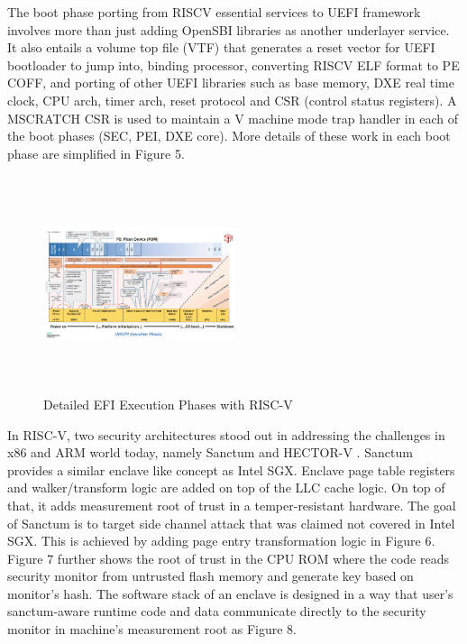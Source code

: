 \documentclass[a4paper,fleqn]{cas-dc}
\begin{document}
The boot phase porting from RISCV essential services to UEFI framework involves more than just adding OpenSBI libraries as another underlayer service. It also entails a volume top file (VTF) that generates a reset vector for UEFI bootloader to jump into, binding processor, converting RISCV ELF format to PE COFF, and porting of other UEFI libraries such as base memory, DXE real time clock, CPU arch, timer arch, reset protocol and CSR (control status registers). A MSCRATCH CSR is used to maintain a V machine mode trap handler in each of the boot phases (SEC, PEI, DXE core). More details of these work in each boot phase are simplified in Figure 5.

\begin{figure}[hbt!]
	\centering
	\includegraphics[width=0.5\textwidth,height=2.5in]{figs/RiscVDetailedEfiFlow.JPG}
	\caption{Detailed EFI Execution Phases with RISC-V}
\end{figure}

In RISC-V, two security architectures stood out in addressing the challenges in x86 and ARM world today, namely Sanctum \cite{R5:6} and HECTOR-V \cite{R5:5}. Sanctum provides a similar enclave like concept as Intel SGX. Enclave page table registers and walker/transform logic are added on top of the LLC cache logic. On top of that, it adds measurement root of trust in a temper-resistant hardware. The goal of Sanctum is to target side channel attack that was claimed not covered in Intel SGX. This is achieved by adding page entry transformation logic in Figure 6. Figure 7 further shows the root of trust in the CPU ROM where the code reads security monitor from untrusted flash memory and generate key based on monitor’s hash. The software stack of an enclave is designed in a way that user’s sanctum-aware runtime code and data communicate directly to the security monitor in machine’s measurement root as Figure 8.
\end{document}
